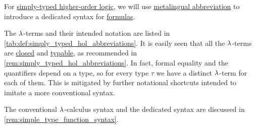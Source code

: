 \begin{definition}\label{def:simply_typed_hol_abbreviations}
  For \hyperref[def:simply_typed_hol]{simply-typed higher-order logic}, we will use \hyperref[con:metalingual_abbreviation]{metalingual abbreviation} to introduce a dedicated syntax for \hyperref[def:simply_typed_hol_formula]{formulas}.

  The \( {\mathrm \lambda} \)-terms and their intended notation are listed in \cref{tab:def:simply_typed_hol_abbreviations}. It is easily seen that all the \( {\mathrm \lambda} \)-terms are \hyperref[def:lambda_combinator]{closed} and \hyperref[def:typability]{typable}, as recommended in \cref{rem:simply_typed_hol_abbreviations}. In fact, formal equality and the quantifiers depend on a type, so for every type \( \tau \) we have a distinct \( {\mathrm \lambda} \)-term for each of them. This is mitigated by further notational shortcuts intended to imitate a more conventional syntax.

  The conventional \( {\mathrm \lambda} \)-calculus syntax and the dedicated syntax are discussed in \cref{rem:simple_type_function_syntax}.


\end{definition}

